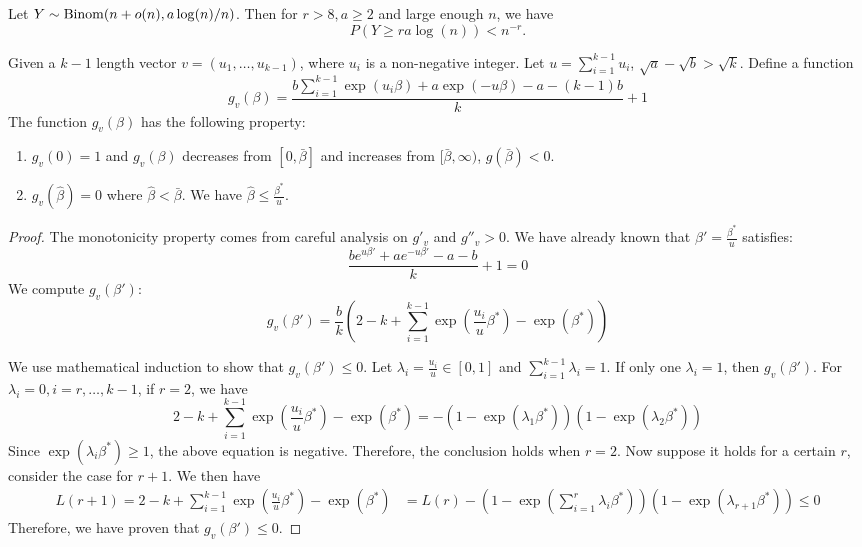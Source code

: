 \documentclass{article}
\begin{document}
\begin{lemma} \label{lm:bmd}
	Let $Y\sim \operatorname{Binom}(n + o(n), a\log(n)/n)$. Then for $r>8, a \geq 2$ and large enough $n$, we have
	$$
	P(Y\ge r a \log(n)) < n^{-r} .
	$$
\end{lemma}
\begin{lemma}\label{lem:g_v_extension}
	Given a $k-1$ length vector $v=(u_1, \dots, u_{k-1})$, where $u_i$ is a non-negative integer.
	Let $u=\sum_{i=1}^{k-1} u_i$, $\sqrt{a} - \sqrt{b} > \sqrt{k}$.
	Define a function
	\begin{equation}\label{eq:gvbeta}
	g_v(\beta) = \frac{b\sum_{i=1}^{k-1}\exp(u_i \beta) + a \exp(-u\beta) - a - (k-1)b}{k}+1
	\end{equation}
	The function $g_v(\beta)$ has the following property:
	\begin{enumerate}
		\item $g_v(0)=1$ and $g_v(\beta)$ decreases from $[0, \bar{\beta}]$ and increases from
		$[\bar{\beta}, \infty)$, $g(\bar{\beta}) < 0$.
		\item $g_v(\hat{\beta}) = 0$ where $\hat{\beta} < \bar{\beta}$. We have $\hat{\beta} \leq \frac{\beta^*}{u}$.
	\end{enumerate}
\end{lemma}
\begin{proof}
	The monotonicity property comes from careful analysis on $g'_v$ and $g''_v>0$.
	We have already known that $\beta' = \frac{\beta^*}{u}$ satisfies:
	$$
	\frac{b e^{u\beta'} + a e^{-u\beta'}-a-b}{k}+1=0
	$$
	We compute $g_v(\beta')$:
	$$
	g_v(\beta') = \frac{b}{k}(2-k + \sum_{i=1}^{k-1}\exp(\frac{u_i}{u} \beta^*) - \exp(\beta^*))
	$$
	
	We use mathematical induction to show that $g_v(\beta') \leq 0$.
	Let $\lambda_i = \frac{u_i}{u} \in [0,1]$ and $\sum_{i=1}^{k-1} \lambda_i = 1$.
	If only one $\lambda_i = 1$, then $g_v(\beta')$.
	For $\lambda_i = 0, i=r,\dots, k-1$, if $r=2$, we have
	$$
	2-k + \sum_{i=1}^{k-1}\exp(\frac{u_i}{u} \beta^*) - \exp(\beta^*)
	= -(1-\exp(\lambda_1 \beta^*))(1-\exp(\lambda_2 \beta^*))
	$$
	Since $\exp(\lambda_i \beta^*) \geq 1$, the above equation is negative.
	Therefore, the conclusion holds when $r=2$.
	Now suppose it holds for a certain $r$, consider the case for $r+1$.
	We then have
	\begin{align*}
	L(r+1) = 2-k + \sum_{i=1}^{k-1}\exp(\frac{u_i}{u} \beta^*) - \exp(\beta^*)
	& = L(r)- (1-\exp(\sum_{i=1}^r \lambda_i \beta^*)) (1-\exp(\lambda_{r+1}\beta^*)) \leq 0
	\end{align*}
	Therefore, we have proven that $g_v(\beta') \leq 0$.
\end{proof}
\end{document}
